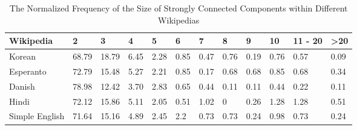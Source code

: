 \documentclass[twoside]{article}
\begin{document}
\begin{table}[h]

\caption{The Normalized Frequency of the Size of Strongly Connected Components within Different Wikipedias}

\centering

\begin{tabular}{| l | l | l | l | l | l |  l | l | l | l | l | l | }

\hline

Wikipedia & 2 & 3 & 4 & 5 & 6 & 7 & 8 & 9 & 10 & {11 - 20} & >20 \\ \hline

Korean & 68.79 & 18.79 & 6.45 & 2.28 & 0.85 & 0.47 & 0.76 & 0.19 & 0.76 & 0.57 & 0.09 \\ \hline

Esperanto & 72.79 & 15.48 & 5.27 & 2.21 & 0.85 & 0.17 & 0.68 & 0.68 & 0.85 & 0.68 & 0.34 \\ \hline

Danish & 78.98 & 12.42 & 3.70 & 2.83 & 0.65 & 0.44 & 0.11 & 0.11 & 0.44 & 0.22 & 0.11 \\ \hline

Hindi & 72.12 & 15.86 & 5.11 & 2.05 & 0.51 & 1.02 & 0 & 0.26 & 1.28  & 1.28 & 0.51 \\ \hline

Simple English & 71.64  & 15.16 & 4.89 & 2.45 & 2.2 & 0.73 & 0.73 & 0.24 & 0.98 & 0.73 & 0.24 \\ \hline

\end{tabular}

\end{table}
\end{document}
